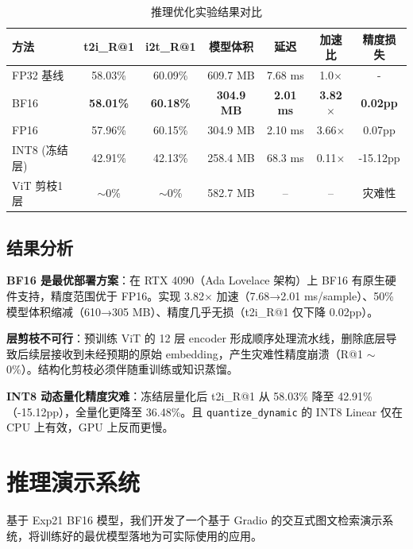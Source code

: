 \documentclass[12pt,a4paper]{article}
\begin{document}
\begin{table}[H]
\centering
\caption{推理优化实验结果对比}
\begin{tabular}{lcccccc}
\toprule
\textbf{方法} & \textbf{t2i\_R@1} & \textbf{i2t\_R@1} & \textbf{模型体积} & \textbf{延迟} & \textbf{加速比} & \textbf{精度损失} \\
\midrule
FP32 基线 & 58.03\% & 60.09\% & 609.7 MB & 7.68 ms & 1.0$\times$ & - \\
\rowcolor{green!30}
BF16 & \textbf{58.01\%} & \textbf{60.18\%} & \textbf{304.9 MB} & \textbf{2.01 ms} & \textbf{3.82$\times$} & \textbf{0.02pp} \\
FP16 & 57.96\% & 60.15\% & 304.9 MB & 2.10 ms & 3.66$\times$ & 0.07pp \\
INT8 (冻结层) & 42.91\% & 42.13\% & 258.4 MB & 68.3 ms & 0.11$\times$ & -15.12pp \\
ViT 剪枝1层 & $\sim$0\% & $\sim$0\% & 582.7 MB & -- & -- & 灾难性 \\
\bottomrule
\end{tabular}
\end{table}

\subsection{结果分析}

\textbf{BF16 是最优部署方案}：在 RTX 4090（Ada Lovelace 架构）上 BF16 有原生硬件支持，精度范围优于 FP16。实现 3.82$\times$ 加速（7.68→2.01 ms/sample）、50\% 模型体积缩减（610→305 MB）、精度几乎无损（t2i\_R@1 仅下降 0.02pp）。

\textbf{层剪枝不可行}：预训练 ViT 的 12 层 encoder 形成顺序处理流水线，删除底层导致后续层接收到未经预期的原始 embedding，产生灾难性精度崩溃（R@1 $\sim$0\%）。结构化剪枝必须伴随重训练或知识蒸馏。

\textbf{INT8 动态量化精度灾难}：冻结层量化后 t2i\_R@1 从 58.03\% 降至 42.91\%（-15.12pp），全量化更降至 36.48\%。且 \texttt{quantize\_dynamic} 的 INT8 Linear 仅在 CPU 上有效，GPU 上反而更慢。

\section{推理演示系统}

基于 Exp21 BF16 模型，我们开发了一个基于 Gradio 的交互式图文检索演示系统，将训练好的最优模型落地为可实际使用的应用。
\end{document}
